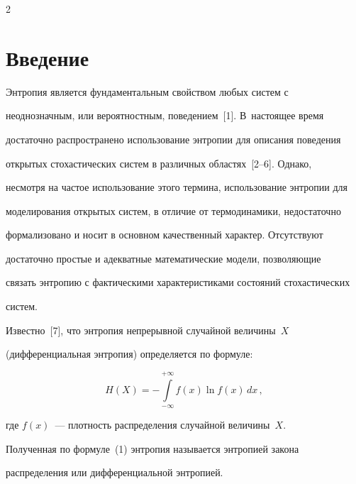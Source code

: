       \thispagestyle{headings}



      \begin{multicols}{2}



            \label{st\stat}

  

  \section{Введение}

  

  Энтропия является фундаментальным свойством любых систем с 

неоднозначным, или вероятностным, поведением~[1]. В~настоящее время 

достаточно распространено использование энтропии для описания поведения 

открытых стохастических систем в различных областях~[2--6]. Однако, 

несмотря на частое использование этого термина, использование энтропии для 

моделирования открытых систем, в отличие от термодинамики, недостаточно 

формализовано и носит в основном качественный характер. Отсутствуют 

достаточно простые и адекватные математические модели, позволяющие 

связать энтропию с фактическими характеристиками состояний стохастических 

систем.

  

  Известно~[7], что энтропия непрерывной случайной величины~$X$ 

(дифференциальная энтропия) определяется по формуле:

  \begin{equation}

  H(X) =-\int\limits_{-\infty}^{+\infty} f(x)\ln f(x)\,dx\,,

  \label{e1-t}

  \end{equation}

  где $f(x)$~--- плотность распределения случайной величины~$X$. 

Полученная по формуле~(1) энтропия называется энтропией закона 

распределения или дифференциальной энтропией.

  


\end{multicols}
